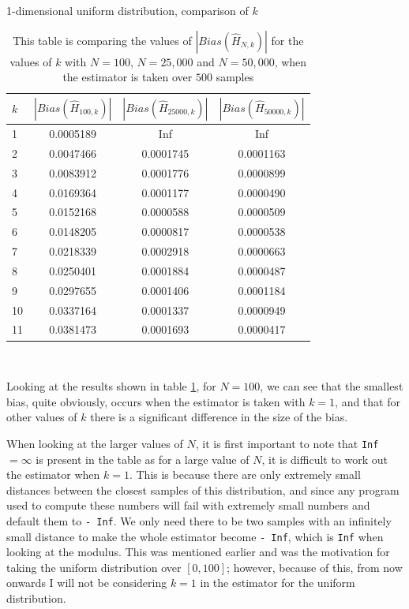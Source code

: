 \documentclass{report}
\begin{document}
\begin{table}
\caption{1-dimensional uniform distribution, comparison of $k$} \label{uniform_kcompare_table}
\begin{center}
\begin{tabular}{| l | c c c |} 
\toprule
$k$ &  $|Bias(\hat{H}_{100, k})|$ & $|Bias(\hat{H}_{25000, k})|$  &  $|Bias(\hat{H}_{50000, k})|$ \\
\midrule[1pt]
1     & 0.0005189    &       Inf    &       Inf   \\
2     & 0.0047466    & 0.0001745    & 0.0001163   \\
3     & 0.0083912    & 0.0001776    & 0.0000899   \\
4     & 0.0169364    & 0.0001177    & 0.0000490   \\
5     & 0.0152168    & 0.0000588    & 0.0000509   \\
6     & 0.0148205    & 0.0000817    & 0.0000538   \\
7     & 0.0218339    & 0.0002918    & 0.0000663   \\
8     & 0.0250401    & 0.0001884    & 0.0000487   \\
9     & 0.0297655    & 0.0001406    & 0.0001184   \\
10    & 0.0337164    & 0.0001337    & 0.0000949   \\
11    & 0.0381473    & 0.0001693    & 0.0000417   \\
\hline
\end{tabular}
\\[10pt]
\caption*{This table is comparing the values of $|Bias(\hat{H}_{N, k})|$ for the values of $k$ with $N=100$, $N=25,000$ and $N=50,000$, when the estimator is taken over $500$ samples}
\end{center}
\end{table}

Looking at the results shown in table \ref{uniform_kcompare_table}, for $N=100$, we can see that the smallest bias, quite obviously, occurs when the estimator is taken with $k=1$, and that for other values of $k$ there is a significant difference in the size of the bias.

When looking at the larger values of $N$, it is first important to note that \texttt{Inf} $= \infty$ is present in the table as for a large value of $N$, it is difficult to work out the estimator when $k=1$. This is because there are only extremely small distances between the closest samples of this distribution, and since any program used to compute these numbers will fail with extremely small numbers and default them to \texttt{- Inf}. We only need there to be two samples with an infinitely small distance to make the whole estimator become \texttt{- Inf}, which is \texttt{Inf} when looking at the modulus. This was mentioned earlier and was the motivation for taking the uniform distribution over $[0, 100]$; however, because of this, from now onwards I will not be considering $k=1$ in the estimator for the uniform distribution.
\end{document}
